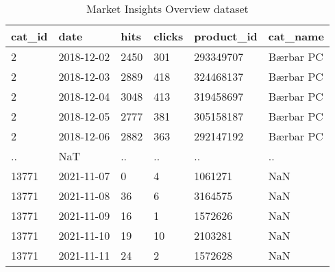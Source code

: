 \begin{table}[htbp]
\centering
\caption{Market Insights Overview dataset}
\label{table:market_insights_overview_11-12-21}
\begin{tabular}{llllll}
\toprule
cat\_id &       date & hits & clicks & product\_id &  cat\_name \\
\midrule
     2 & 2018-12-02 & 2450 &    301 &  293349707 & Bærbar PC \\
     2 & 2018-12-03 & 2889 &    418 &  324468137 & Bærbar PC \\
     2 & 2018-12-04 & 3048 &    413 &  319458697 & Bærbar PC \\
     2 & 2018-12-05 & 2777 &    381 &  305158187 & Bærbar PC \\
     2 & 2018-12-06 & 2882 &    363 &  292147192 & Bærbar PC \\
    .. &        NaT &   .. &     .. &         .. &        .. \\
 13771 & 2021-11-07 &    0 &      4 &    1061271 &       NaN \\
 13771 & 2021-11-08 &   36 &      6 &    3164575 &       NaN \\
 13771 & 2021-11-09 &   16 &      1 &    1572626 &       NaN \\
 13771 & 2021-11-10 &   19 &     10 &    2103281 &       NaN \\
 13771 & 2021-11-11 &   24 &      2 &    1572628 &       NaN \\
\bottomrule
\end{tabular}
\end{table}
